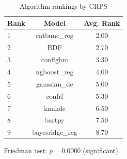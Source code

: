 \begin{table}[htbp]
\centering
\caption{Algorithm rankings by CRPS}
\label{tab:rankings-crps}
\begin{tabular}{lcc}
\toprule
Rank & Model & Avg. Rank \\
\midrule
1 & catbunc\_reg & 2.00 \\
2 & BDF & 2.70 \\
3 & conflgbm & 3.30 \\
4 & ngboost\_reg & 4.00 \\
5 & gaussian\_de & 5.00 \\
6 & confrf & 5.30 \\
7 & knnkde & 6.50 \\
8 & bartpy & 7.50 \\
9 & bayesridge\_reg & 8.70 \\
\bottomrule
\end{tabular}
\par\smallskip\footnotesize{Friedman test: $p = 0.0000$ (significant).}
\end{table}
